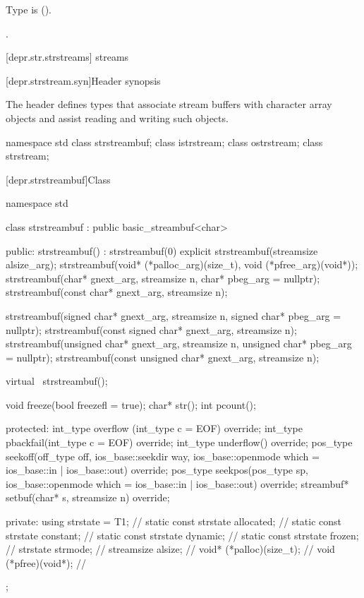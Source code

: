 \begin{itemdescr}
\pnum
\requires
Type  is  ().

\pnum
\returns
{}.
\end{itemdescr}

[depr.str.strstreams]{ streams}

[depr.strstream.syn]{Header  synopsis}

\pnum
The header 
defines types that associate stream buffers with
character array objects and assist reading and writing such objects.

\begin{codeblock}
namespace std {
  class strstreambuf;
  class istrstream;
  class ostrstream;
  class strstream;
}
\end{codeblock}

[depr.strstreambuf]{Class }

%
\begin{codeblock}
namespace std {
  class strstreambuf : public basic_streambuf<char> {
  public:
    strstreambuf() : strstreambuf(0) {}
    explicit strstreambuf(streamsize alsize_arg);
    strstreambuf(void* (*palloc_arg)(size_t), void (*pfree_arg)(void*));
    strstreambuf(char* gnext_arg, streamsize n, char* pbeg_arg = nullptr);
    strstreambuf(const char* gnext_arg, streamsize n);

    strstreambuf(signed char* gnext_arg, streamsize n,
                 signed char* pbeg_arg = nullptr);
    strstreambuf(const signed char* gnext_arg, streamsize n);
    strstreambuf(unsigned char* gnext_arg, streamsize n,
                 unsigned char* pbeg_arg = nullptr);
    strstreambuf(const unsigned char* gnext_arg, streamsize n);

    virtual ~strstreambuf();

    void  freeze(bool freezefl = true);
    char* str();
    int   pcount();

  protected:
    int_type overflow (int_type c = EOF) override;
    int_type pbackfail(int_type c = EOF) override;
    int_type underflow() override;
    pos_type seekoff(off_type off, ios_base::seekdir way,
                     ios_base::openmode which
                      = ios_base::in | ios_base::out) override;
    pos_type seekpos(pos_type sp,
                     ios_base::openmode which
                      = ios_base::in | ios_base::out) override;
    streambuf* setbuf(char* s, streamsize n) override;

  private:
    using strstate = T1;                // \expos
    static const strstate allocated;    // \expos
    static const strstate constant;     // \expos
    static const strstate dynamic;      // \expos
    static const strstate frozen;       // \expos
    strstate strmode;                   // \expos
    streamsize alsize;                  // \expos
    void* (*palloc)(size_t);            // \expos
    void (*pfree)(void*);               // \expos
  };
}
\end{codeblock}

